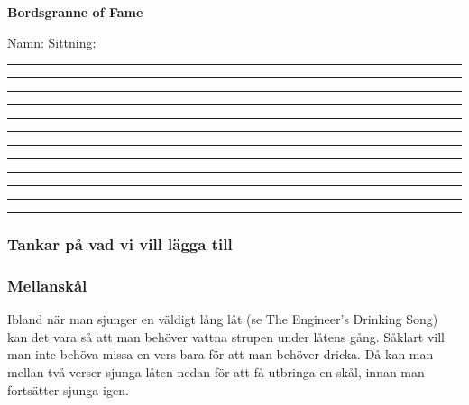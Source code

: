 {\noBackground

\newpage
\resetBackground

\thispagestyle{plainnohead}

\vspace*{-13mm} %
\enlargethispage{15mm} %

\begin{center}
    \normalfont\normalsize\bfseries Bordsgranne of Fame
\end{center}

Namn: \hspace{2.5cm} Sittning: 

\vspace*{0.3cm}
\rule{\textwidth}{0.0mm}
\vspace*{0.65cm}
\rule{\textwidth}{0.4mm}
\vspace*{0.65cm}
\rule{\textwidth}{0.4mm}
\vspace*{0.65cm}
\rule{\textwidth}{0.4mm}
\vspace*{0.65cm}
\rule{\textwidth}{0.4mm}
\vspace*{0.65cm}
\rule{\textwidth}{0.4mm}
\vspace*{0.65cm}
\rule{\textwidth}{0.4mm}
\vspace*{0.65cm}
\rule{\textwidth}{0.4mm}
\vspace*{0.65cm}
\rule{\textwidth}{0.4mm}
\vspace*{0.65cm}
\rule{\textwidth}{0.4mm}
\vspace*{0.65cm}
\rule{\textwidth}{0.4mm}
\vspace*{0.65cm}
\rule{\textwidth}{0.4mm}

\noBackground

\newpage
\resetBackground




\subsubsection*{Tankar på vad vi vill lägga till}

\subsubsection*{Mellanskål}
Ibland när man sjunger en väldigt lång låt (se The Engineer's Drinking Song) kan det vara så att man behöver vattna strupen under låtens gång. Såklart vill man inte behöva missa en vers bara för att man behöver dricka. Då kan man mellan två verser sjunga låten nedan för att få utbringa en skål, innan man fortsätter sjunga igen.

}
